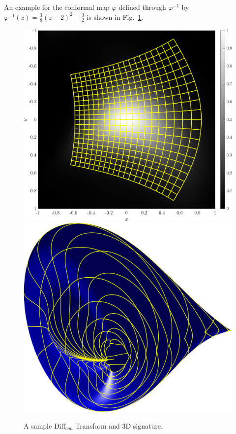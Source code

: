 \documentclass{artjlt}
\begin{document}
An example for the conformal map $\varphi$ defined through $\varphi^{-1}$ by
$\varphi^{-1}(z) = \frac{3}{8}(z - 2)^2 - \frac{3}{2}$ is shown in
Fig.~\ref{fig:Diffcon}.
\begin{figure}
\centering 
\includegraphics[width=.45\textwidth]{Figs/f_transformed_Diffcon.png}
\includegraphics[width=.45\textwidth]{Figs/Diffcon_signature.png}
\caption{A sample $\text{Diff}_{con}$ Transform and 3D signature.}
\label{fig:Diffcon}
\end{figure}



\end{document}
